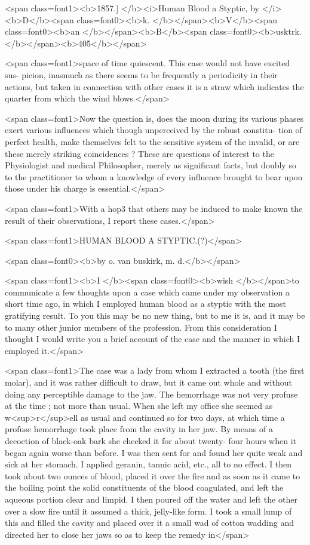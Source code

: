 <span class=font1><b>1857.]     </b><i>Human Blood a Styptic, by </i><b>D</b><span class=font0><b>k. </b></span><b>V</b><span class=font0><b>an </b></span><b>B</b><span class=font0><b>usktrk. </b></span><b>405</b></span>

<span class=font1>space of time quiescent. This case would not have excited sus-
picion, inasmuch as there seems to be frequently a periodicity in their
actions, but taken in connection with other cases it is a straw which
indicates the quarter from which the wind blows.</span>

<span class=font1>Now the question is, does the moon during its various phases exert
various influences which though unperceived by the robust constitu-
tion of perfect health, make themselves felt to the sensitive system
of the invalid, or are these merely striking coincidences ? These are
questions of interest to the Physiologist and medical Philosopher,
merely as significant facts, but doubly so to the practitioner to whom
a knowledge of every influence brought to bear upon those under his
charge is essential.</span>

<span class=font1>With a hop3 that others may be induced to make known the result
of their observations, I report these cases.</span>

<span class=font1>HUMAN BLOOD A STYPTIC.(?)</span>

<span class=font0><b>by o. van buskirk, m. d.</b></span>

<span class=font1><b>I </b><span class=font0><b>wish </b></span>to communicate a few thoughts upon a case which came under
my observation a short time ago, in which I employed human blood as
a styptic with the most gratifying result. To you this may be no new
thing, but to me it is, and it may be to many other junior members of
the profession. From this consideration I thought I would write you
a brief account of the case and the manner in which I employed it.</span>

<span class=font1>The case was a lady from whom I extracted a tooth (the first molar),
and it was rather difficult to draw, but it came out whole and without
doing any perceptible damage to the jaw. The hemorrhage was not
very profuse at the time ; not more than usual. When she left my office
she seemed as w<sup>r</sup>ell as usual and continued so for two days, at which
time a profuse hemorrhage took place from the cavity in her jaw. By
means of a decoction of black-oak bark she checked it for about twenty-
four hours when it began again worse than before. I was then sent for
and found her quite weak and sick at her stomach. I applied geranin,
tannic acid, etc., all to no effect. I then took about two ounces of blood,
placed it over the fire and as soon as it came to the boiling point the
solid constituents of the blood coagulated, and left the aqueous portion
clear and limpid. I then poured off the water and left the other over
a slow fire until it assumed a thick, jelly-like form. I took a small lump
of this and filled the cavity and placed over it a small wad of cotton
wadding and directed her to close her jaws so as to keep the remedy in</span>\endinput
